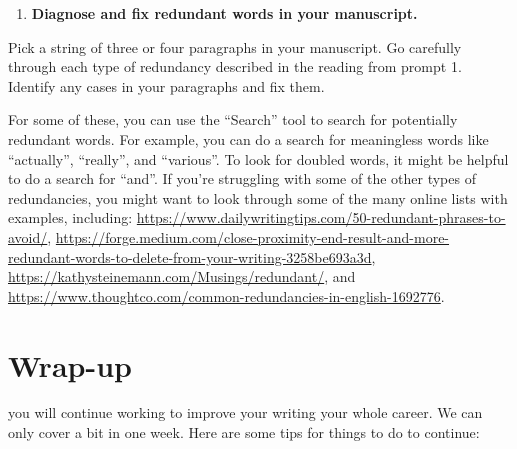 \documentclass[]{tufte-book}
\providecommand{\tightlist}{%
  \setlength{\itemsep}{0pt}\setlength{\parskip}{0pt}}
\begin{document}
\begin{enumerate}
\def\labelenumi{\arabic{enumi}.}
\setcounter{enumi}{2}
\tightlist
\item
  \textbf{Diagnose and fix redundant words in your manuscript.}
\end{enumerate}

Pick a string of three or four paragraphs in your manuscript. Go carefully through
each type of redundancy described in the reading from prompt 1. Identify any
cases in your paragraphs and fix them.

For some of these, you can use the ``Search'' tool to search for potentially redundant
words. For example, you can do a search for meaningless words like ``actually'',
``really'', and ``various''. To look for doubled words, it might be helpful to do a
search for ``and''. If you're struggling with some of the other types of redundancies,
you might want to look through some of the many online lists with examples,
including: \url{https://www.dailywritingtips.com/50-redundant-phrases-to-avoid/},
\url{https://forge.medium.com/close-proximity-end-result-and-more-redundant-words-to-delete-from-your-writing-3258be693a3d},
\url{https://kathysteinemann.com/Musings/redundant/}, and
\url{https://www.thoughtco.com/common-redundancies-in-english-1692776}.

\hypertarget{wrap-up}{%
\chapter{Wrap-up}\label{wrap-up}}

 you will continue working to improve your
writing your whole career. We can only cover a bit in one week. Here are some tips for
things to do to continue:
\end{document}
